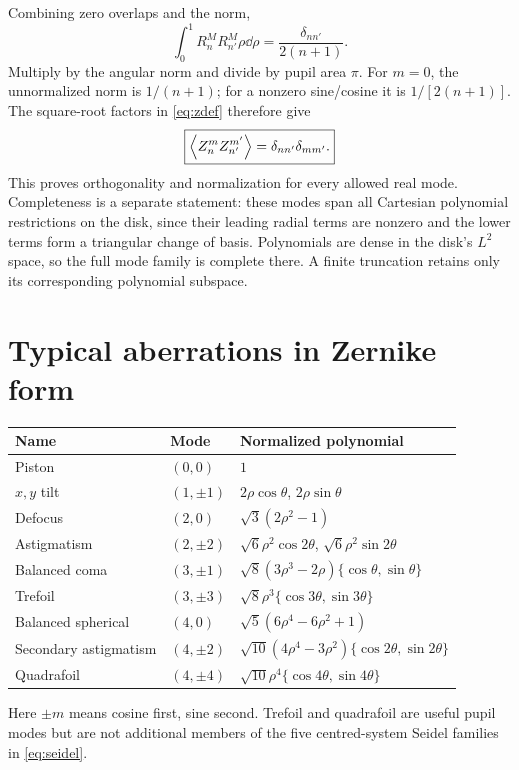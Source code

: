 Combining zero overlaps and the norm,
\begin{equation}
\int_0^1R_n^M R_{n'}^M\rho\dd\rho
=\frac{\delta_{nn'}}{2(n+1)}.
\end{equation}
Multiply by the angular norm and divide by pupil area $\pi$. For $m=0$, the unnormalized norm is $1/(n+1)$; for a nonzero sine/cosine it is $1/[2(n+1)]$. The square-root factors in \eqref{eq:zdef} therefore give
\begin{equation}
\boxed{\left\langle Z_n^mZ_{n'}^{m'}\right\rangle=\delta_{nn'}\delta_{mm'}.}
\label{eq:orth}
\end{equation}
This proves orthogonality and normalization for every allowed real mode. Completeness is a separate statement: these modes span all Cartesian polynomial restrictions on the disk, since their leading radial terms are nonzero and the lower terms form a triangular change of basis. Polynomials are dense in the disk's $L^2$ space, so the full mode family is complete there. A finite truncation retains only its corresponding polynomial subspace.

\section{Typical aberrations in Zernike form}
\begin{center}\small
\begin{tabularx}{\textwidth}{@{}l l Y@{}}\toprule
Name & Mode & Normalized polynomial\\\midrule
Piston & $(0,0)$ & $1$\\
$x,y$ tilt & $(1,\pm1)$ & $2\rho\cos\theta$, $2\rho\sin\theta$\\
Defocus & $(2,0)$ & $\sqrt3(2\rho^2-1)$\\
Astigmatism & $(2,\pm2)$ & $\sqrt6\rho^2\cos2\theta$, $\sqrt6\rho^2\sin2\theta$\\
Balanced coma & $(3,\pm1)$ & $\sqrt8(3\rho^3-2\rho)\{\cos\theta,\sin\theta\}$\\
Trefoil & $(3,\pm3)$ & $\sqrt8\rho^3\{\cos3\theta,\sin3\theta\}$\\
Balanced spherical & $(4,0)$ & $\sqrt5(6\rho^4-6\rho^2+1)$\\
Secondary astigmatism & $(4,\pm2)$ & $\sqrt{10}(4\rho^4-3\rho^2)\{\cos2\theta,\sin2\theta\}$\\
Quadrafoil & $(4,\pm4)$ & $\sqrt{10}\rho^4\{\cos4\theta,\sin4\theta\}$\\\bottomrule
\end{tabularx}\end{center}
Here $\pm m$ means cosine first, sine second. Trefoil and quadrafoil are useful pupil modes but are not additional members of the five centred-system Seidel families in \eqref{eq:seidel}.

